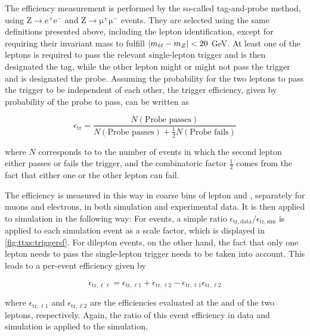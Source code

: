 The efficiency measurement is performed by the so-called tag-and-probe method, using $\mathrm{Z} \rightarrow \mathrm{e^+ e^-}$ and $\mathrm{Z} \rightarrow \mathrm{\mu^+ \mu^-}$ events. They are selected using the same definitions presented above, including the lepton identification, except for requiring their invariant mass to fulfill $| m_{\ell\ell} - m_Z | < 20$ GeV. At least one of the leptons is required to pass the relevant single-lepton trigger and is then designated the tag, while the other lepton might or might not pass the trigger and is designated the probe. Assuming the probability for the two leptons to pass the trigger to be independent of each other, the trigger efficiency, given by probability of the probe to pass, can be written as

\begin{equation}
    \epsilon_{\mathrm{tr}} = \frac{N (\text{Probe passes})}{ N (\text{Probe passes}) + \frac{1}{2} N (\text{Probe fails}) }
\end{equation}

where $N$ corresponds to to the number of events in which the second lepton either passes or fails the trigger, and the combinatoric factor $\frac{1}{2}$ comes from the fact that either one or the other lepton can fail. 

The efficiency is measured in this way in coarse bins of lepton \pt and \abseta, separately for muons and electrons, in both simulation and experimental data. It is then applied to simulation in the following way: For \ljets events, a simple ratio $\epsilon_{\mathrm{tr,data}} / \epsilon_{\mathrm{tr,sim}}$ is applied to each simulation event as a scale factor, which is displayed in \cref{fig:ttxs:triggersf}. For dilepton events, on the other hand, the fact that only one lepton needs to pass the single-lepton trigger needs to be taken into account. This leads to a per-event efficiency given by

\begin{equation}
\label{eq:ttxs:triggersf}
    \epsilon_{\mathrm{tr,\ell \ell}} = \epsilon_{\mathrm{tr,\ell 1}} + \epsilon_{\mathrm{tr,\ell 2}} - \epsilon_{\mathrm{tr,\ell 1}} \epsilon_{\mathrm{tr,\ell 2}}
\end{equation}

where $\epsilon_{\mathrm{tr,\ell 1}}$ and $\epsilon_{\mathrm{tr,\ell 2}}$ are the efficiencies evaluated at the \pt and \abseta of the two leptons, respectively. Again, the ratio of this event efficiency in data and simulation is applied to the simulation.

